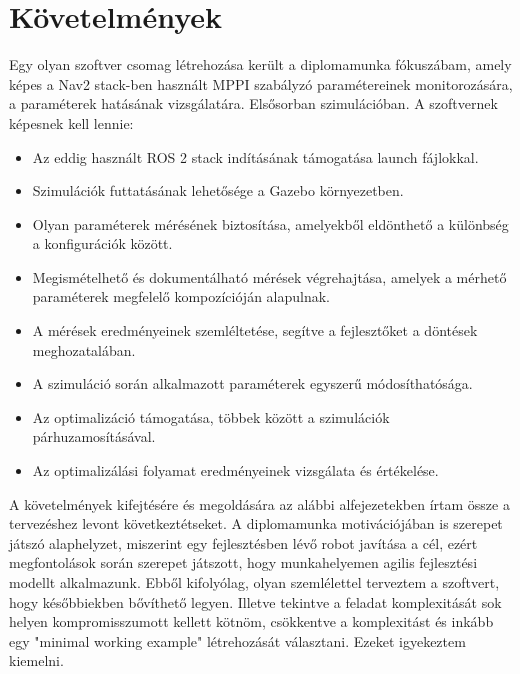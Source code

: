 \section{Követelmények}
Egy olyan szoftver csomag létrehozása került a diplomamunka fókuszábam, amely képes a Nav2 stack-ben használt MPPI szabályzó paramétereinek monitorozására, a paraméterek hatásának vizsgálatára. Elsősorban szimulációban. A szoftvernek képesnek kell lennie:
\begin{itemize}
    \item Az eddig használt ROS 2 stack indításának támogatása launch fájlokkal.
    \item Szimulációk futtatásának lehetősége a Gazebo környezetben.
    \item Olyan paraméterek mérésének biztosítása, amelyekből eldönthető a különbség a konfigurációk között.
    \item Megismételhető és dokumentálható mérések végrehajtása, amelyek a mérhető paraméterek megfelelő kompozícióján alapulnak.
    \item A mérések eredményeinek szemléltetése, segítve a fejlesztőket a döntések meghozatalában.
    \item A szimuláció során alkalmazott paraméterek egyszerű módosíthatósága.
    \item Az optimalizáció támogatása, többek között a szimulációk párhuzamosításával.
    \item Az optimalizálási folyamat eredményeinek vizsgálata és értékelése.
\end{itemize}

A követelmények kifejtésére és megoldására az alábbi alfejezetekben írtam össze a tervezéshez levont következtétseket. A diplomamunka motivációjában is szerepet játszó alaphelyzet, miszerint egy fejlesztésben lévő robot javítása a cél, ezért megfontolások során szerepet játszott, hogy munkahelyemen agilis fejlesztési modellt alkalmazunk. Ebből kifolyólag, olyan szemlélettel terveztem a szoftvert, hogy későbbiekben bővíthető legyen. Illetve tekintve a feladat komplexitását sok helyen kompromisszumott kellett kötnöm, csökkentve a komplexitást és inkább egy "minimal working example" létrehozását választani. Ezeket igyekeztem kiemelni.

